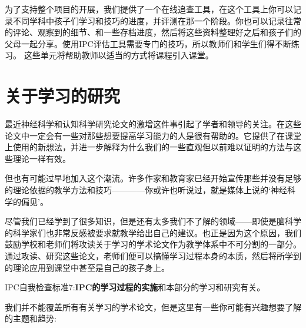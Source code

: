     为了支持整个项目的开展，我们提供了一个在线追查工具，在这个工具上你可以记录不同学科中孩子们学习和技巧的进度，并评测在那一个阶段。你也可以记录往常的评论、观察到的细节、和一些存档进度，然后将这些资料整理好之后和孩子们的父母一起分享。使用IPC评估工具需要专门的技巧，所以教师们和学生们得不断练习。 这些单元将帮助教师以适当的方式将课程引入课堂。\par

\section{关于学习的研究}
   最近神经科学和认知科学研究论文的激增这件事引起了学者和领导的关注。在这些论文中一定会有一些对那些想要提高学习能力的人是很有帮助的。它提供了在课堂上使用的新想法，并进一步解释为什么我们的一些直观但以前难以证明的方法与这些理论一样有效。   \par
   但也有可能过早地加入这个潮流。许多作家和教育家已经开始宣传那些并没有足够的理论依据的教学方法和技巧————你或许也听说过，就是媒体上说的‘神经科学的偏见’。  \par
   尽管我们已经学到了很多知识，但是还有太多我们不了解的领域——即使是脑科学的科学家们也非常反感被要求就教学给出自己的建议。也正是因为这个原因，我们鼓励学校和老师们将攻读关于学习的学术论文作为教学体系中不可分割的一部分。通过攻读、研究这些论文，老师们便可以搞懂学习过程本身的本质，然后将所学到的理论应用到课堂中甚至是自己的孩子身上。\par
   IPC自我检查标准7:\textbf{IPC的学习过程的实施}和本部分的学习和研究有关。\par

   我们并不能覆盖所有有关学习的学术论文，但是这里有一些你可能有兴趣想要了解的主题和趋势:
